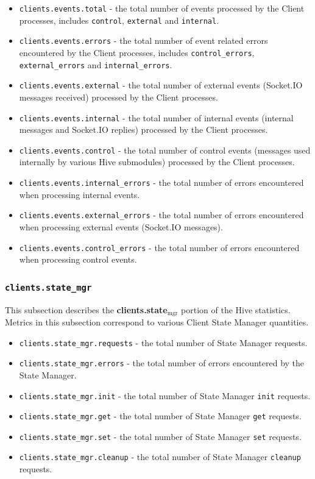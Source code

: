 \documentclass[a4paper]{article}
\begin{document}
\begin{itemize}
\item \texttt{clients.events.total} - the total number of events processed by the Client processes, includes \texttt{control}, \texttt{external} and \texttt{internal}.
\item \texttt{clients.events.errors} - the total number of event related errors encountered by the Client processes, includes \texttt{control\_errors}, \texttt{external\_errors} and \texttt{internal\_errors}.
\item \texttt{clients.events.external} - the total number of external events (Socket.IO messages received) processed by the Client processes.
\item \texttt{clients.events.internal} - the total number of internal events (internal messages and Socket.IO replies) processed by the Client processes.
\item \texttt{clients.events.control} - the total number of control events (messages used internally by various Hive submodules) processed by the Client processes.
\item \texttt{clients.events.internal\_errors} - the total number of errors encountered when processing internal events.
\item \texttt{clients.events.external\_errors} - the total number of errors encountered when processing external events (Socket.IO messages).
\item \texttt{clients.events.control\_errors} - the total number of errors encountered when processing control events.
\end{itemize}
\subsubsection{\texttt{clients.state\_mgr}}
\label{sec-4-2-8}

This subsection describes the \textbf{clients.state$_{\mathrm{mgr}}$} portion of the Hive statistics. Metrics in this subsection correspond to various Client State Manager quantities.


\begin{itemize}
\item \texttt{clients.state\_mgr.requests} - the total number of State Manager requests.
\item \texttt{clients.state\_mgr.errors} - the total number of errors encountered by the State Manager.
\item \texttt{clients.state\_mgr.init} - the total number of State Manager \texttt{init} requests.
\item \texttt{clients.state\_mgr.get} - the total number of State Manager \texttt{get} requests.
\item \texttt{clients.state\_mgr.set} - the total number of State Manager \texttt{set} requests.
\item \texttt{clients.state\_mgr.cleanup} - the total number of State Manager \texttt{cleanup} requests.
\end{itemize}
\end{document}
